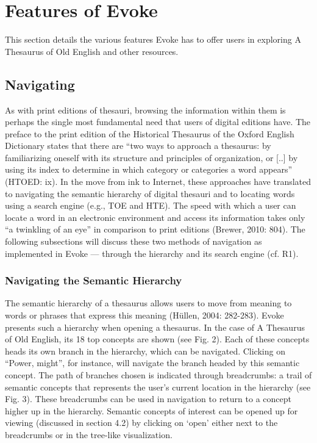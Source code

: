 \section{Features of Evoke}

This section details the various features Evoke has to offer users in exploring A Thesaurus of Old English and other resources. 

\subsection{Navigating}
As with print editions of thesauri, browsing the information within them is perhaps the single most fundamental need that users of digital editions have. The preface to the print edition of the Historical Thesaurus of the Oxford English Dictionary states that there are “two ways to approach a thesaurus: by familiarizing oneself with its structure and principles of organization, or [..] by using its index to determine in which category or categories a word appears” (HTOED: ix). In the move from ink to Internet, these approaches have translated to navigating the semantic hierarchy of digital thesauri and to locating words using a search engine (e.g., TOE and HTE). The speed with which a user can locate a word in an electronic environment and access its information takes only “a twinkling of an eye” in comparison to print editions (Brewer, 2010: 804). The following subsections will discuss these two methods of navigation as implemented in Evoke — through the hierarchy and its search engine (cf. R1).

\subsubsection{Navigating the Semantic Hierarchy}
The semantic hierarchy of a thesaurus allows users to move from meaning to words or phrases that express this meaning (Hüllen, 2004: 282-283). Evoke presents such a hierarchy when opening a thesaurus. In the case of A Thesaurus of Old English, its 18 top concepts are shown (see Fig. 2). Each of these concepts heads its own branch in the hierarchy, which can be navigated. Clicking on “Power, might”, for instance, will navigate the branch headed by this semantic concept. The path of branches chosen is indicated through breadcrumbs: a trail of semantic concepts that represents the user’s current location in the hierarchy (see Fig. 3). These breadcrumbs can be used in navigation to return to a concept higher up in the hierarchy. Semantic concepts of interest can be opened up for viewing (discussed in section 4.2) by clicking on ‘open’ either next to the breadcrumbs or in the tree-like visualization.



